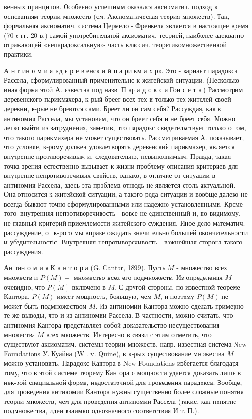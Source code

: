 \documentclass[10pt]{article}
\begin{document}
венных принципов. Особенно успешным оказался аксиоматич. подход к основаниям теории множеств (см. Аксиоматическая теория множеств). Так, формальная аксиоматич. система Цермело - Френкеля является в настоящее время (70-е гг. 20 в.) самой употребительной аксиоматич. теорией, наиболее адекватно отражающей «непарадоксальную» часть классич. теоретикомножественной практики.



А н т ин о м и я «д е р е в енск и й п а ри км а х р». Это - вариант парадокса Рассела, сформулированный применительно к житейской ситуации. (Несколько иная форма этой А. известна под назв. П ар а д о к с а Гон с е т а.) Рассмотрим деревенского парикмахера, к-рый бреет всех тех и только тех жителей своей деревни, к-рые не бреются сами. Бреет ли он сам себя? Рассуждая, как в антиномии Рассела, мы установим, что он бреет себя и не бреет себя. Можно легко выйти из затруднения, заметив, что парадокс свидетельствует только о том, что такого парикмахера не может существовать. Рассматриваемая А. показывает, что условие, к-рому должен удовлетворять деревенский парикмахер, является внутренне противоречивым и, следовательно, невыполнимым. Правда, такая точка зрения естественно вызывает к жизни проблему описания критериев для внутренне непротиворечивых свойств, однако, в отличие от ситуации в антиномии Рассела, здесь эта проблема отнюдь не является столь актуальной. Она относится к житейской ситуации, а такого рода ситуации и вообще далеко не всегда бывают точно сформулированными или надежно установленными. Кроме того, внутренняя непротиворечивость - вовсе не единственный и, по-видимому, не главный критерий приемлемости житейского суждения. Иное дело математич. рассуждение, от к-рого мы вправе ожидать значительно большей окончательности и убедительностіс. Внутренняя непротиворечивость - важнейшая сторона такого рассуждения.



Ан тин о м и я К а н т о р а (G. Cantor, 1899). Пусть $M$ - множество всех множеств и $P(M)-$ множество всех его подмножеств. Из определения $M$ очевидно, что $P(M)$ включено в $M$. С другой стороны, по известной теореме Кантора, $\dot{P}(M)$ имеет мощность, большую, чем $M$, и поэтому $\dot{P}(M)$ не может быть подмножеством $M$. Из антиномии Кантора можно сделать примерно те же выводы, что и из антиномии Рассела. В частности, можно считать, что антиномия Кантора представляет собой доказательство несуществования множества $M$ всех множеств. Интересно в связи с этим отметить, что существуют аксиоматич. системы теории множеств, напр. известная система $\mathrm{New}$ Foundations У. Куайна (W . v. Quine), в к-рых существование множества $M$ можно установить. Парадокс Кантора в New Foundations избегается благодаря тому, что в этой системе теорему Кантора о мощности удается доказать лишь в нек-рой специальной форме, недостаточной для проведения парадокса. Вообще, для проведения антиномии Кантора нужны существенно более сложные понятия теории множеств, чем для проведения антиномии Рассела (такие, как понятие подмножества, идеи взаимно однозначного соответствия И т. П.).
\end{document}
